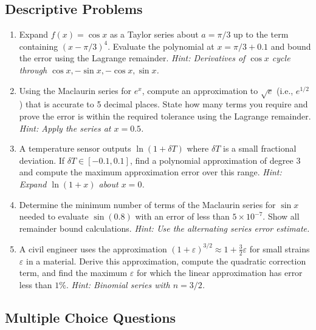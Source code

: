 \documentclass[12pt,a4paper]{article}
\begin{document}
\subsection*{Descriptive Problems}

\begin{enumerate}[leftmargin=2em, label=\textbf{D\arabic*.}]

\item Expand \(f(x) = \cos x\) as a Taylor series about \(a = \pi/3\) up to the term containing
  \((x - \pi/3)^4\). Evaluate the polynomial at \(x = \pi/3 + 0.1\) and bound the error using the
  Lagrange remainder.
  \textit{Hint: Derivatives of \(\cos x\) cycle through \(\cos x, -\sin x, -\cos x, \sin x\).}

\item Using the Maclaurin series for \(e^x\), compute an approximation to \(\sqrt{e}\) (i.e.,
  \(e^{1/2}\)) that is accurate to 5 decimal places. State how many terms you require and prove
  the error is within the required tolerance using the Lagrange remainder.
  \textit{Hint: Apply the series at \(x = 0.5\).}

\item A temperature sensor outputs \(\ln(1 + \delta T)\) where \(\delta T\) is a small fractional
  deviation. If \(\delta T \in [-0.1, 0.1]\), find a polynomial approximation of degree 3 and
  compute the maximum approximation error over this range.
  \textit{Hint: Expand \(\ln(1+x)\) about \(x = 0\).}

\item Determine the minimum number of terms of the Maclaurin series for \(\sin x\) needed to
  evaluate \(\sin(0.8)\) with an error of less than \(5 \times 10^{-7}\). Show all remainder bound
  calculations.
  \textit{Hint: Use the alternating series error estimate.}

\item A civil engineer uses the approximation \((1 + \varepsilon)^{3/2} \approx 1 + \frac{3}{2}\varepsilon\)
  for small strains \(\varepsilon\) in a material. Derive this approximation, compute the
  quadratic correction term, and find the maximum \(\varepsilon\) for which the linear
  approximation has error less than \(1\%\).
  \textit{Hint: Binomial series with \(n = 3/2\).}

\end{enumerate}

\subsection*{Multiple Choice Questions}
\end{document}
